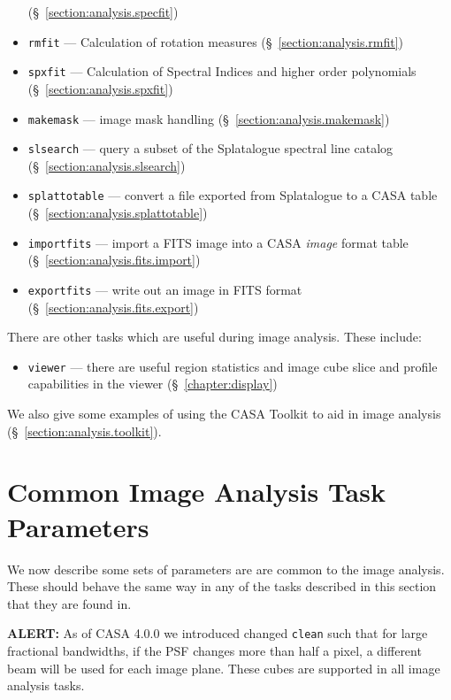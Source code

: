 \begin{itemize}
        (\S~\ref{section:analysis.specfit})
   \item{\tt rmfit} --- Calculation of rotation measures
        (\S~\ref{section:analysis.rmfit})
   \item{\tt spxfit} --- Calculation of Spectral Indices and higher order polynomials
        (\S~\ref{section:analysis.spxfit})
    \item {\tt makemask} --- image mask handling
         (\S~\ref{section:analysis.makemask})
  \item{\tt slsearch} --- query a subset of the Splatalogue spectral
line catalog
          (\S~\ref{section:analysis.slsearch})
  \item{\tt splattotable} --- convert a file exported from Splatalogue
to a CASA table 
          (\S~\ref{section:analysis.splattotable})
   \item {\tt importfits} --- import a FITS image into a CASA  
         {\it image} format table 
         (\S~\ref{section:analysis.fits.import})
   \item {\tt exportfits} --- write out an image in FITS format
         (\S~\ref{section:analysis.fits.export})
\end{itemize}

There are other tasks which are useful during image analysis.  These
include:
\begin{itemize}
   \item {\tt viewer} --- there are useful region statistics and
         image cube slice and profile capabilities in the viewer 
         (\S~\ref{chapter:display})
\end{itemize}

We also give some examples of using the CASA Toolkit to aid in
image analysis (\S~\ref{section:analysis.toolkit}).

\section{Common Image Analysis Task Parameters}
\label{section:analysis.pars}

We now describe some sets of parameters are are common to the image
analysis.  These should behave the same way in any of the tasks
described in this section that they are found in.  

{\bf ALERT:} As of CASA 4.0.0 we introduced changed {\tt clean} such
that for large fractional bandwidths, if the PSF changes more than
half a pixel, a different beam will be used for each image
plane. These cubes are supported in all image analysis tasks.  

